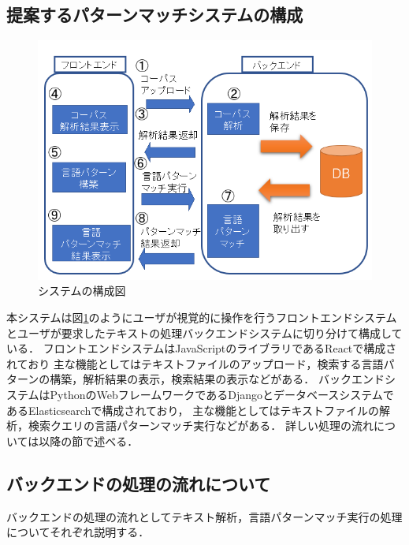 \documentclass{FITpaper}
\begin{document}
\subsection{提案するパターンマッチシステムの構成}

\begin{figure}[htbp]
  \centering
  \includegraphics[scale=0.4]{fig/system_fig.png}
  \caption{システムの構成図}
  \label{fig:sys}
\end{figure}

本システムは図\ref{fig:sys}のようにユーザが視覚的に操作を行うフロントエンドシステムとユーザが要求したテキストの処理バックエンドシステムに切り分けて構成している．
フロントエンドシステムはJavaScriptのライブラリであるReactで構成されており
主な機能としてはテキストファイルのアップロード，検索する言語パターンの構築，解析結果の表示，検索結果の表示などがある．
バックエンドシステムはPythonのWebフレームワークであるDjangoとデータベースシステムであるElasticsearchで構成されており，
主な機能としてはテキストファイルの解析，検索クエリの言語パターンマッチ実行などがある．
詳しい処理の流れについては以降の節で述べる．

\subsection{バックエンドの処理の流れについて}
バックエンドの処理の流れとしてテキスト解析，言語パターンマッチ実行の処理についてそれぞれ説明する．
\end{document}
